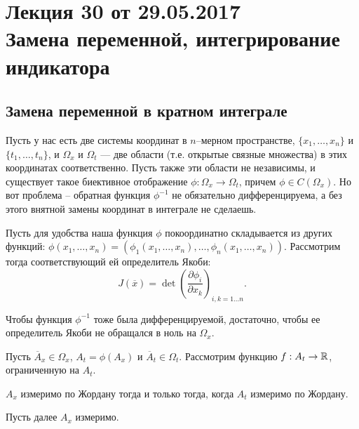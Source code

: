 \section{Лекция 30 от 29.05.2017 \\ Замена переменной, интегрирование индикатора}

\subsection{Замена переменной в кратном интеграле}
Пусть у нас есть две системы координат в $n$--мерном пространстве, $\{x_1, \ldots, x_n\}$ и $\{ t_1, \ldots, t_n \}$, и $\Omega_x$ и $\Omega_t$ --- две области (т.е. открытые связные множества) в этих координатах соответственно. Пусть также эти области не независимы, и существует такое биективное отображение $\phi: \Omega_x \to \Omega_t$, причем $\phi \in C(\Omega_x)$. Но вот проблема -- обратная функция $\phi^{-1}$ не обязательно дифференцируема, а без этого внятной замены координат в интеграле не сделаешь.

Пусть для удобства наша функция $\phi$ покоординатно складывается из других функций: $\phi(x_1, \ldots, x_n) = (\phi_1(x_1, \ldots, x_n), \ldots, \phi_n(x_1, \ldots, x_n))$. Рассмотрим тогда соответствующий ей определитель Якоби:
$$
J(\overline x) = \det \left(\frac{\partial \phi_i}{\partial x_k} \right)_{i, k = 1 \ldots n}.
$$

\begin{Statement}
Чтобы функция $\phi^{-1}$ тоже была дифференцируемой, достаточно, чтобы ее определитель Якоби не обращался в ноль на $\Omega_x$.
\end{Statement}

Пусть $\overline A_x \in \Omega_x$, $A_t = \phi(A_x)$ и $\overline A_t \in \Omega_t$. Рассмотрим функцию $f: A_t \to \mathbb{R}$, ограниченную на $A_t$.

\begin{Statement}
$A_x$ измеримо по Жордану тогда и только тогда, когда $A_t$ измеримо по Жордану.
\end{Statement}

Пусть далее $A_x$ измеримо.

